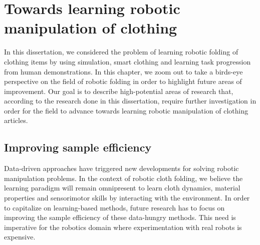 \documentclass[\home/main.tex]{subfiles}
\begin{document}
\chapter{Towards learning robotic manipulation of clothing}\label{ch:towards_robotic_folding}

In this dissertation, we considered the problem of learning robotic folding of clothing items by using simulation, smart clothing and learning task progression from human demonstrations. In this chapter, we zoom out to take a birds-eye perspective on the field of robotic folding in order to highlight future areas of improvement. Our goal is to describe high-potential areas of research that, according to the research done in this dissertation, require further investigation in order for the field to advance towards learning robotic manipulation of clothing articles.

\section{Improving sample efficiency}

Data-driven approaches have triggered new developments for solving robotic manipulation problems. In the context of robotic cloth folding, we believe the learning paradigm will remain omnipresent to learn cloth dynamics, material properties and sensorimotor skills by interacting with the environment. In order to capitalize on learning-based methods, future research has to focus on improving the sample efficiency of these data-hungry methods. This need is imperative for the robotics domain where experimentation with real robots is expensive. 
\end{document}
